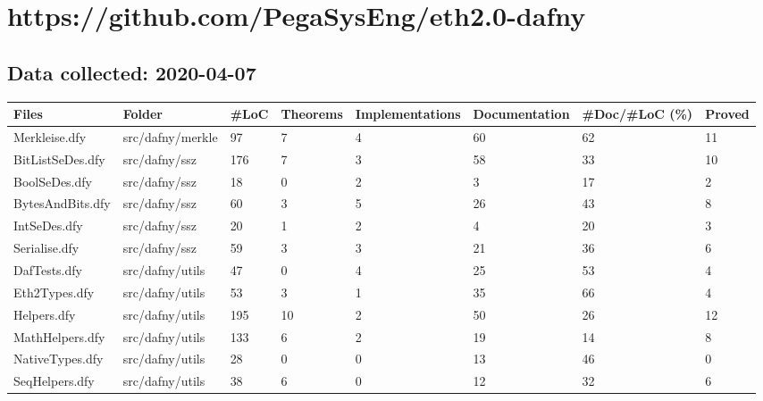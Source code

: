 \documentclass[a4paper, 12pt]{article}
\begin{document}
\section*{https://github.com/PegaSysEng/eth2.0-dafny}
\subsection*{Data collected: 2020-04-07}
\scriptsize
\begin{tabular}{llllllll}
\toprule
                  Files &             Folder & \#LoC & Theorems & Implementations & Documentation & \#Doc/\#LoC (\%) & Proved \\
\midrule
          Merkleise.dfy &   src/dafny/merkle &   97 &        7 &               4 &            60 &            62 &     11 \\
       BitListSeDes.dfy &      src/dafny/ssz &  176 &        7 &               3 &            58 &            33 &     10 \\
          BoolSeDes.dfy &      src/dafny/ssz &   18 &        0 &               2 &             3 &            17 &      2 \\
       BytesAndBits.dfy &      src/dafny/ssz &   60 &        3 &               5 &            26 &            43 &      8 \\
           IntSeDes.dfy &      src/dafny/ssz &   20 &        1 &               2 &             4 &            20 &      3 \\
          Serialise.dfy &      src/dafny/ssz &   59 &        3 &               3 &            21 &            36 &      6 \\
           DafTests.dfy &    src/dafny/utils &   47 &        0 &               4 &            25 &            53 &      4 \\
          Eth2Types.dfy &    src/dafny/utils &   53 &        3 &               1 &            35 &            66 &      4 \\
            Helpers.dfy &    src/dafny/utils &  195 &       10 &               2 &            50 &            26 &     12 \\
        MathHelpers.dfy &    src/dafny/utils &  133 &        6 &               2 &            19 &            14 &      8 \\
        NativeTypes.dfy &    src/dafny/utils &   28 &        0 &               0 &            13 &            46 &      0 \\
         SeqHelpers.dfy &    src/dafny/utils &   38 &        6 &               0 &            12 &            32 &      6 \\

\end{tabular}
\end{document}
